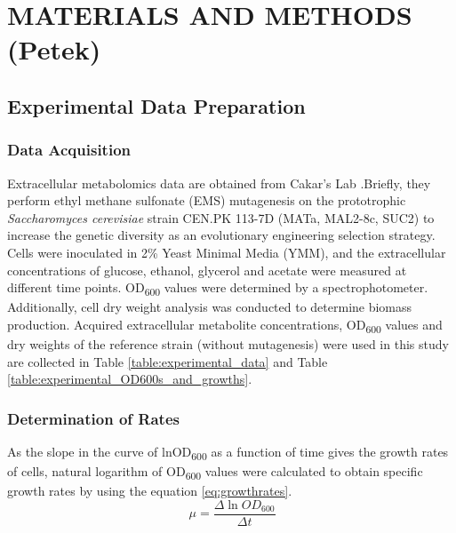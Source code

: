 \chapter{MATERIALS AND METHODS (Petek)}

\section{Experimental Data Preparation}
\subsection{Data Acquisition}
Extracellular metabolomics data are obtained from Cakar's Lab \cite{arslan2018physiological}.Briefly, they perform ethyl methane sulfonate (EMS) mutagenesis  on the prototrophic \emph{Saccharomyces cerevisiae} strain CEN.PK 113-7D (MATa, MAL2-8c, SUC2) to increase the genetic diversity as an evolutionary engineering selection strategy. Cells were inoculated in 2\% Yeast Minimal Media (YMM), and the extracellular concentrations of glucose, ethanol, glycerol and acetate were measured at different time points. OD\textsubscript{600} values were determined by a spectrophotometer. Additionally, cell dry weight analysis was conducted to determine biomass production. Acquired extracellular metabolite concentrations, OD\textsubscript{600} values and dry weights of the reference strain (without mutagenesis) were used in this study are collected in Table \ref{table:experimental_data} and Table \ref{table:experimental_OD600s_and_growths}.




\subsection{Determination of Rates}
As the slope in the curve of lnOD\textsubscript{600} as a function of time gives the growth rates of cells, natural logarithm of OD\textsubscript{600} values were calculated to obtain specific growth rates by using the equation \ref{eq:growthrates}.
  \begin{equation}
      \ \mu = \frac{\Delta \ln{OD_{600}}}{\Delta t}
      \label{eq:growthrates}
  \end{equation}

